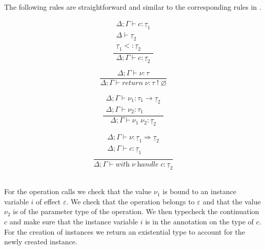 \documentclass[12pt]{article}
\newcommand\eff[0]{\varepsilon}
\newcommand\ty[0]{\tau}
\newcommand\tarr[2]{#1 \rightarrow #2}
\newcommand\thandler[2]{#1 \Rightarrow #2}
\newcommand\cty[0]{\underline{\ty}}
\newcommand\aty[2]{#1 \; ! \; #2}
\newcommand\val[0]{\nu}
\newcommand\comp[0]{c}
\newcommand\creturn[1]{\textit{return} \; #1}
\newcommand\capp[2]{#1 \; #2}
\newcommand\chandle[2]{\textit{with} \; #1 \; \textit{handle} \; #2}
\newcommand\subty[2]{#1 <: #2}
\begin{document}
\newpage
The following rules are straightforward and similar to the corresponding rules in \cite{effectsystem}.\\
\begin{minipage}{0.5\textwidth}
\[\frac{
	\begin{array}{l}
	\Delta;\Gamma \vdash \comp : \cty_1 \\
	\Delta \vdash \cty_2 \\
	\subty{\cty_1}{\cty_2}
	\end{array}
}{
	\Delta;\Gamma \vdash \comp : \cty_2
}\]
\vspace{10pt}
\end{minipage}
\begin{minipage}{0.5\textwidth}
\[\frac{
	\Delta;\Gamma \vdash \val : \ty
}{
	\Delta;\Gamma \vdash \creturn{\val} : \aty{\ty}{\varnothing}
}\]
\vspace{10pt}
\end{minipage}
\begin{minipage}{0.5\textwidth}
\[\frac{
	\begin{array}{l}
	\Delta;\Gamma \vdash \val_1 : \tarr{\ty_1}{\cty_2} \\
	\Delta;\Gamma \vdash \val_2 : \ty_1
	\end{array}
}{
	\Delta;\Gamma \vdash \capp{\val_1}{\val_2} : \cty_2
}\]
\vspace{10pt}
\end{minipage}
\begin{minipage}{0.5\textwidth}
\[\frac{
	\begin{array}{l}
	\Delta;\Gamma \vdash \val : \thandler{\cty_1}{\cty_2} \\
	\Delta;\Gamma \vdash \comp : \cty_1 \\
	\end{array}
}{
	\Delta;\Gamma \vdash \chandle{\val}{\comp} : \cty_2
}\]
\vspace{10pt}
\end{minipage}
\\

For the operation calls we check that the value $\val_1$ is bound to an instance variable $i$ of effect $\eff$.
We check that the operation belongs to $\eff$ and that the value $\val_2$ is of the parameter type of the operation.
We then typecheck the continuation $c$ and make sure that the instance variable $i$ is in the annotation on the type of $c$. \\
For the creation of instances we return an existential type to account for the newly created instance. \\
\end{document}

